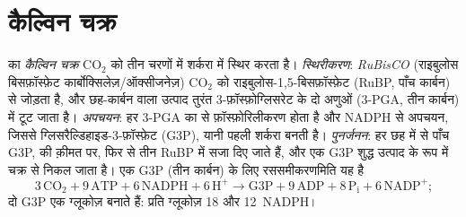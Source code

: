 \section{कैल्विन चक्र}

\begin{definition}[कार्बन स्थिरीकरण]\label{def:b1:photosynthesis:fixation}
 का \emph{कैल्विन चक्र} $\mathrm{CO_2}$ को तीन चरणों में शर्करा
में स्थिर करता है। \emph{स्थिरीकरण}: \emph{RuBisCO} (राइबुलोस
बिसफ़ॉस्फ़ेट कार्बोक्सिलेज़/ऑक्सीजनेज़) $\mathrm{CO_2}$ को
राइबुलोस-1,5-बिसफ़ॉस्फ़ेट (RuBP, पाँच कार्बन) से जोड़ता है, और छह-कार्बन
वाला उत्पाद तुरंत 3-फ़ॉस्फ़ोग्लिसरेट के दो अणुओं
(3-PGA, तीन कार्बन) में टूट जाता है। \emph{अपचयन}: हर 3-PGA का  से
फ़ॉस्फ़ोरिलीकरण होता है और NADPH से अपचयन, जिससे
ग्लिसरैल्डिहाइड-3-फ़ॉस्फ़ेट (G3P), यानी पहली शर्करा बनती है।
\emph{पुनर्जनन}: हर छह में से पाँच G3P,  की क़ीमत पर, फिर से तीन RuBP
में सजा दिए जाते हैं, और एक G3P शुद्ध उत्पाद के रूप में चक्र से निकल जाता
है। एक G3P (तीन कार्बन) के लिए रससमीकरणमिति यह है
\[
3\,\mathrm{CO_2} + 9\,\mathrm{ATP} + 6\,\mathrm{NADPH} + 6\,\mathrm{H^+}
\to \text{G3P} + 9\,\mathrm{ADP} + 8\,\mathrm{P_i} + 6\,\mathrm{NADP^+} ;
\]
दो G3P एक ग्लूकोज़ बनाते हैं: प्रति ग्लूकोज़ \qty{18}{}  और \qty{12}{NADPH}।
\end{definition}

